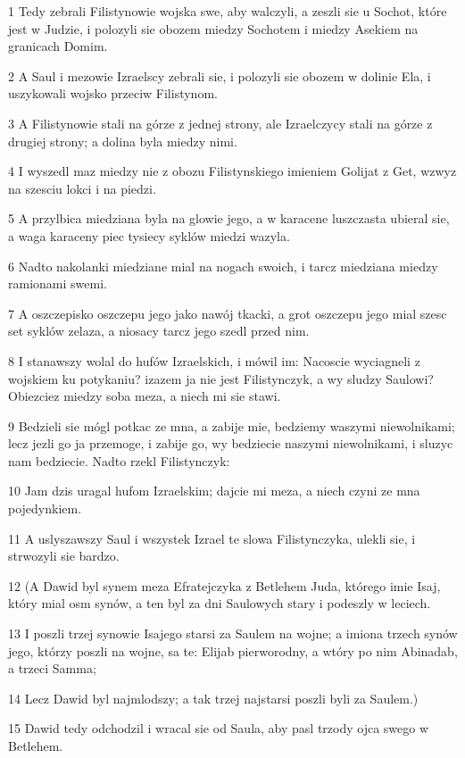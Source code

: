 \par 1 Tedy zebrali Filistynowie wojska swe, aby walczyli, a zeszli sie u Sochot, które jest w Judzie, i polozyli sie obozem miedzy Sochotem i miedzy Asekiem na granicach Domim.
\par 2 A Saul i mezowie Izraelscy zebrali sie, i polozyli sie obozem w dolinie Ela, i uszykowali wojsko przeciw Filistynom.
\par 3 A Filistynowie stali na górze z jednej strony, ale Izraelczycy stali na górze z drugiej strony; a dolina byla miedzy nimi.
\par 4 I wyszedl maz miedzy nie z obozu Filistynskiego imieniem Golijat z Get, wzwyz na szesciu lokci i na piedzi.
\par 5 A przylbica miedziana byla na glowie jego, a w karacene luszczasta ubieral sie, a waga karaceny piec tysiecy syklów miedzi wazyla.
\par 6 Nadto nakolanki miedziane mial na nogach swoich, i tarcz miedziana miedzy ramionami swemi.
\par 7 A oszczepisko oszczepu jego jako nawój tkacki, a grot oszczepu jego mial szesc set syklów zelaza, a niosacy tarcz jego szedl przed nim.
\par 8 I stanawszy wolal do hufów Izraelskich, i mówil im: Nacoscie wyciagneli z wojskiem ku potykaniu? izazem ja nie jest Filistynczyk, a wy sludzy Saulowi? Obiezciez miedzy soba meza, a niech mi sie stawi.
\par 9 Bedzieli sie mógl potkac ze mna, a zabije mie, bedziemy waszymi niewolnikami; lecz jezli go ja przemoge, i zabije go, wy bedziecie naszymi niewolnikami, i sluzyc nam bedziecie. Nadto rzekl Filistynczyk:
\par 10 Jam dzis uragal hufom Izraelskim; dajcie mi meza, a niech czyni ze mna pojedynkiem.
\par 11 A uslyszawszy Saul i wszystek Izrael te slowa Filistynczyka, ulekli sie, i strwozyli sie bardzo.
\par 12 (A Dawid byl synem meza Efratejczyka z Betlehem Juda, którego imie Isaj, który mial osm synów, a ten byl za dni Saulowych stary i podeszly w leciech.
\par 13 I poszli trzej synowie Isajego starsi za Saulem na wojne; a imiona trzech synów jego, którzy poszli na wojne, sa te: Elijab pierworodny, a wtóry po nim Abinadab, a trzeci Samma;
\par 14 Lecz Dawid byl najmlodszy; a tak trzej najstarsi poszli byli za Saulem.)
\par 15 Dawid tedy odchodzil i wracal sie od Saula, aby pasl trzody ojca swego w Betlehem.
